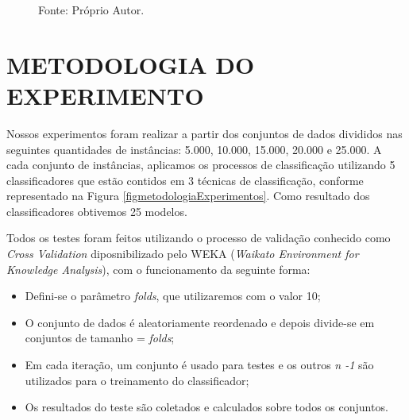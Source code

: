 \documentclass[
	12pt,				%
	openright,			%
	oneside,	
	a4paper,				%
	english,				%
	brazil				%
]{abntex2/abntex2} %
\begin{document}
\begin{itemize}
\begin{figure}[!h]
\begin{center}
				\end{center}
			\hspace{4cm} {\fontsize{10}{\baselineskip} \selectfont Fonte: Próprio Autor.}
			\end{figure}
		\end{itemize}

	\vspace{-1.5\baselineskip}	
	\section{METODOLOGIA DO EXPERIMENTO}
	\vspace{1\baselineskip}
	Nossos experimentos foram realizar a partir dos conjuntos de dados divididos nas seguintes quantidades de instâncias: 5.000, 10.000, 15.000, 20.000 e 25.000. A cada conjunto de instâncias, aplicamos os processos de classificação utilizando 5 classificadores que estão contidos em 3 técnicas de classificação, conforme representado na Figura \ref{figmetodologiaExperimentos}. Como resultado dos classificadores obtivemos 25 modelos. 
	
	Todos os testes foram feitos utilizando o processo de validação conhecido como \textit{Cross Validation} diposnibilizado pelo WEKA (\textit{Waikato Environment for Knowledge Analysis}), com o funcionamento da seguinte forma:
	\begin{itemize}
		\item Defini-se o parâmetro \textit{folds}, que utilizaremos com o valor 10;
		\item O conjunto de dados é aleatoriamente reordenado e depois divide-se em conjuntos de tamanho = \textit{folds};
		\item Em cada iteração, um conjunto é usado para testes e os outros \textit{n -1} são utilizados para o treinamento do classificador;
		\item Os resultados do teste são coletados e calculados sobre todos os conjuntos.
	\end{itemize}
	 
\end{document}
